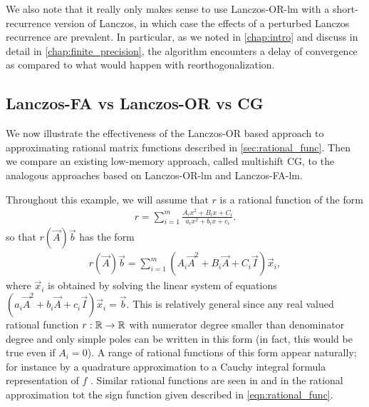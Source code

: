 We also note that it really only makes sense to use Lanczos-OR-lm with a short-recurrence version of Lanczos, in which case the effects of a perturbed Lanczos recurrence are prevalent. 
In particular, as we noted in \cref{chap:intro} and discuss in detail in \cref{chap:finite_precision}, the algorithm encounters a delay of convergence as compared to what would happen with reorthogonalization.


\subsection{Lanczos-FA vs Lanczos-OR vs CG}
\label{ex:lanczos_msCG_comparison}

%



We now illustrate the effectiveness of the Lanczos-OR based approach to approximating rational matrix functions described in \cref{sec:rational_func}.
Then we compare an existing low-memory approach, called multishift CG, to the analogous approaches based on Lanczos-OR-lm and Lanczos-FA-lm.

Throughout this example, we will assume that $r$ is a rational function of the form
\begin{align}
\label{eqn:rat_form}
r = \sum_{i=1}^{m} \frac{A_ix^2+B_ix+C_i}{a_ix^2+b_ix+c_i}.
\end{align}
so that $r(\vec{A})\vec{b}$ has the form
\begin{align*}
    r(\vec{A})\vec{b} = \sum_{i=1}^{m} (A_i\vec{A}^2 + B_i\vec{A} + C_i\vec{I}) \vec{x}_i,
\end{align*}
where $\vec{x}_i$ is obtained by solving the linear system of equations $(a_i\vec{A}^2 + b_i \vec{A} + c_i \vec{I}) \vec{x}_i = \vec{b}$.
This is relatively general since any real valued rational function $r:\mathbb{R}\to\mathbb{R}$ with numerator degree smaller than denominator degree and only simple poles can be written in this form (in fact, this would be true even if $A_i=0$).
A range of rational functions of this form appear naturally; for instance by a quadrature approximation to a Cauchy integral formula representation of $f$ \cite{hale_higham_trefethen_08}.
Similar rational functions are seen in \cite{eshof_frommer_lippert_schilling_van_der_vorst_02,frommer_simoncini_09} and in the rational approximation tot the sign function given described in \cref{eqn:rational_func}.


